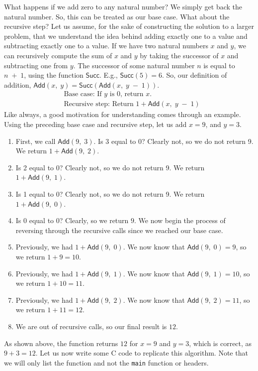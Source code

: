What happens if we add zero to any natural number? We simply get back the natural number. So, this can be treated as our base case. What about the recursive step? Let us assume, for the sake of constructing the solution to a larger problem, that we understand the idea behind adding exactly one to a value and subtracting exactly one to a value. If we have two natural numbers $x$ and $y$, we can recursively compute the sum of $x$ and $y$ by taking the successor of $x$ and subtracting one from $y$. The successor of some natural number $n$ is equal to $n\;+\;1$, using the function $\textsf{Succ}$. E.g., $\textsf{Succ}(5)=6$. So, our definition of addition, $\textsf{Add}(x,\;y) = \textsf{Succ}(\textsf{Add}(x,\;y\;-\;1))$. 
\begin{align*}
    &\text{Base case: If }y\text{ is }0\text{, return } x.\\
    &\text{Recursive step: Return }1 + \textsf{Add}(x,\;y\;-\;1)
\end{align*}
Like always, a good motivation for understanding comes through an example. Using the preceding base case and recursive step, let us add $x = 9$, and $y = 3$.
\begin{enumerate}[label=(\roman*)]
    \item First, we call $\textsf{Add}(9,\;3)$. Is 3 equal to 0? Clearly not, so we do not return 9. We return $1 + \textsf{Add}(9,\;2)$.
    \item Is 2 equal to 0? Clearly not, so we do not return 9. We return $1 + \textsf{Add}(9,\;1)$.
    \item Is 1 equal to 0? Clearly not, so we do not return 9. We return $1 + \textsf{Add}(9,\;0)$.
    \item Is 0 equal to 0? Clearly, so we return $9$. We now begin the process of reversing through the recursive calls since we reached our base case.
    \item Previously, we had $1 + \textsf{Add}(9,\;0)$. We now know that $\textsf{Add}(9,\;0) = 9$, so we return $1 + 9 = 10$.
    \item Previously, we had $1 + \textsf{Add}(9,\;1)$. We now know that $\textsf{Add}(9,\;1) = 10$, so we return $1 + 10 = 11$.
    \item Previously, we had $1 + \textsf{Add}(9,\;2)$. We now know that $\textsf{Add}(9,\;2) = 11$, so we return $1 + 11 = 12$.
    \item We are out of recursive calls, so our final result is $12$.
\end{enumerate}
As shown above, the function returns $12$ for $x=9$ and $y=3$, which is correct, as $9 + 3 = 12$. Let us now write some C code to replicate this algorithm. Note that we will only list the function and not the \texttt{main} function or headers.

